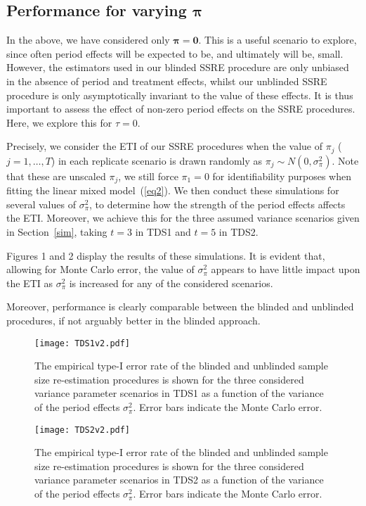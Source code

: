 \documentclass{article}
\begin{document}
\subsection{Performance for varying $\boldsymbol{\pi}$}

In the above, we have considered only $\boldsymbol{\pi}=\boldsymbol{0}$. This is a useful scenario to explore, since often period effects will be expected to be, and ultimately will be, small. However, the estimators used in our blinded SSRE procedure are only unbiased in the absence of period and treatment effects, whilst our unblinded SSRE procedure is only asymptotically invariant to the value of these effects. It is thus important to assess the effect of non-zero period effects on the SSRE procedures. Here, we explore this for $\tau=0$.

Precisely, we consider the ETI of our SSRE procedures when the value of $\pi_j$ ($j=1,\dots,T$) in each replicate scenario is drawn randomly as $\pi_j \sim N(0,\sigma_\pi^2)$. Note that these are unscaled $\pi_j$, we still force $\pi_1=0$ for identifiability purposes when fitting the linear mixed model~(\ref{eq2}). We then conduct these simulations for several values of $\sigma_\pi^2$, to determine how the strength of the period effects affects the ETI. Moreover, we achieve this for the three assumed variance scenarios given in Section~\ref{sim}, taking $t=3$ in TDS1 and $t=5$ in TDS2.

Figures 1 and 2 display the results of these simulations. It is evident that, allowing for Monte Carlo error, the value of $\sigma_\pi^2$ appears to have little impact upon the ETI as $\sigma_\pi^2$ is increased for any of the considered scenarios. 

Moreover, performance is clearly comparable between the blinded and unblinded procedures, if not arguably better in the blinded approach.

\begin{figure}[htb]
	\begin{center}\label{pi1}
		\texttt{[image: TDS1v2.pdf]}
		\caption{The empirical type-I error rate of the blinded and unblinded sample size re-estimation procedures is shown for the three considered variance parameter scenarios in TDS1 as a function of the variance of the period effects $\sigma_\pi^2$. Error bars indicate the Monte Carlo error.}
	\end{center}
\end{figure}

\begin{figure}[htb]
	\begin{center}\label{pi2}
		\texttt{[image: TDS2v2.pdf]}
		\caption{The empirical type-I error rate of the blinded and unblinded sample size re-estimation procedures is shown for the three considered variance parameter scenarios in TDS2 as a function of the variance of the period effects $\sigma_\pi^2$. Error bars indicate the Monte Carlo error.}
	\end{center}
\end{figure}
\end{document}
